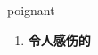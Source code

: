 
\begin{frame}
{\huge poignant}
\begin{center}
\begin{enumerate}\Large
  \item \textbf{令人感伤的}
\end{enumerate}
\end{center}
\end{frame}
